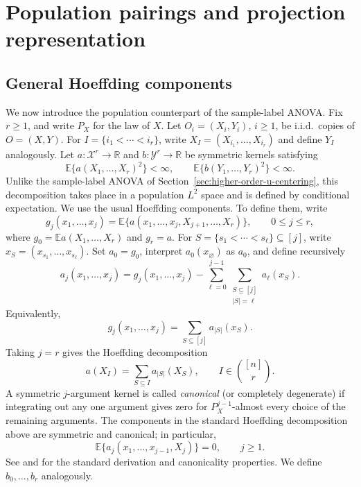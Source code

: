 \documentclass[11pt]{article}
\theoremstyle{plain}
\theoremstyle{definition}
\theoremstyle{remark}
\newcommand{\R}{\mathbb R}
\newcommand{\E}{\mathbb E}
\begin{document}
\section{Population pairings and projection representation}
\label{sec:population-pairings}

\subsection{General Hoeffding components}\label{sec:general_hoeffding}

We now introduce the population counterpart of the sample-label ANOVA\@.
Fix $r\ge1$, and write $P_X$ for the law of $X$.  Let
$O_i=(X_i,Y_i)$, $i\ge1$, be i.i.d.\ copies of $O=(X,Y)$.  For
$I=\{i_1<\cdots<i_r\}$, write $X_I=(X_{i_1},\ldots,X_{i_r})$ and define
$Y_I$ analogously.  Let $a:\mathcal X^r\to\R$ and
$b:\mathcal Y^r\to\R$ be symmetric kernels satisfying
\[
 \E\{a(X_1,\ldots,X_r)^2\}<\infty,
 \qquad
 \E\{b(Y_1,\ldots,Y_r)^2\}<\infty.
\]
Unlike the sample-label ANOVA of Section~\ref{sec:higher-order-u-centering}, this decomposition takes place in
a population $L^2$ space and is defined by conditional expectation.  We use
the usual Hoeffding components.  To define them, write
\[
 g_j(x_1,\ldots,x_j)
 =\E\{a(x_1,\ldots,x_j,X_{j+1},\ldots,X_r)\},
 \qquad 0\le j\le r,
\]
where $g_0=\E a(X_1,\ldots,X_r)$ and $g_r=a$.  For
$S=\{s_1<\cdots<s_\ell\}\subseteq[j]$, write
$x_S=(x_{s_1},\ldots,x_{s_\ell})$.  Set $a_0=g_0$, interpret
$a_0(x_\varnothing)$ as $a_0$, and define recursively
\[
 a_j(x_1,\ldots,x_j)
 =g_j(x_1,\ldots,x_j)
 -\sum_{\ell=0}^{j-1}
   \sum_{\substack{S\subseteq[j]\\|S|=\ell}}a_\ell(x_S).
\]
Equivalently,
\[
 g_j(x_1,\ldots,x_j)
 =\sum_{S\subseteq[j]}a_{|S|}(x_S).
\]
Taking $j=r$ gives the Hoeffding decomposition
\begin{equation}\label{eq:general-hoeffding-decomp}
 a(X_I)=\sum_{S\subseteq I}a_{|S|}(X_S),
 \qquad I\in\binom{[n]}r.
\end{equation}
A symmetric $j$-argument kernel is called \emph{canonical} (or completely
degenerate) if integrating out any one argument gives zero for
$P_X^{j-1}$-almost every choice of the remaining arguments.  The components
in the standard Hoeffding decomposition above are symmetric and canonical;
in particular,
\begin{equation}\label{eq:general-canonical}
 \E\{a_j(x_1,\ldots,x_{j-1},X_j)\}=0,
 \qquad j\ge1.
\end{equation}
See \citet{Hoeffding1948} and \citet{Serfling1980} for the standard
derivation and canonicality properties.
We define $b_0,\ldots,b_r$ analogously.
\end{document}
